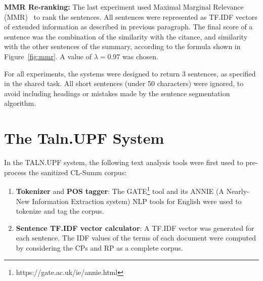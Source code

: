 \documentclass[11pt]{article}
\begin{document}
\textbf{MMR Re-ranking:}
The last experiment used Maximal Marginal Relevance (MMR)~\cite{Carbonell:1998} 
to rank the sentences. All sentences were represented as TF.IDF vectors of 
extended information as described in previous paragraph. The final score 
of a sentence was the combination of the similarity with the citance, and 
similarity with the other sentences of the summary, according to the formula 
shown in Figure~\ref{fig:mmr}. A value of $\lambda=0.97$ was chosen.

For all experiments, the systems were designed to return 3 sentences, as specified 
in the shared task. All short sentences (under 50 characters) were ignored, to 
avoid including headings or mistakes made by the sentence segmentation algorithm.


\section{The Taln.UPF System}

In the TALN.UPF system, the following text analysis tools were first used to pre-process the sanitized CL-Summ corpus:
\begin{enumerate}
\item \textbf{Tokenizer} and \textbf{POS tagger}: The GATE\footnote{https://gate.ac.uk/ie/annie.html} tool and its 
ANNIE (A Nearly-New Information Extraction system) NLP tools for English were used to tokenize and tag the corpus.
\vspace{-.3cm}
\item \textbf{Sentence TF.IDF vector calculator}: A TF.IDF vector was generated for each sentence. The IDF values of the terms of each document were computed by considering the CPs and RP as a complete corpus.
\vspace{-.3cm}
\end{enumerate}
\end{document}
